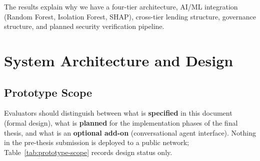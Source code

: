 \documentclass[12pt,a4paper]{report}
\begin{document}
The results explain why we have a four-tier architecture, AI/ML integration (Random Forest, Isolation Forest, SHAP), cross-tier lending structure, governance structure, and planned security verification pipeline.


\chapter{System Architecture and Design}

\section{Prototype Scope}
\label{sec:prototype-scope}

Evaluators should distinguish between what is \textbf{specified} in this document (formal design), what is \textbf{planned} for the implementation phases of the final thesis, and what is an \textbf{optional add-on} (conversational agent interface). Nothing in the pre-thesis submission is deployed to a public network; Table~\ref{tab:prototype-scope} records design status only.
\end{document}
